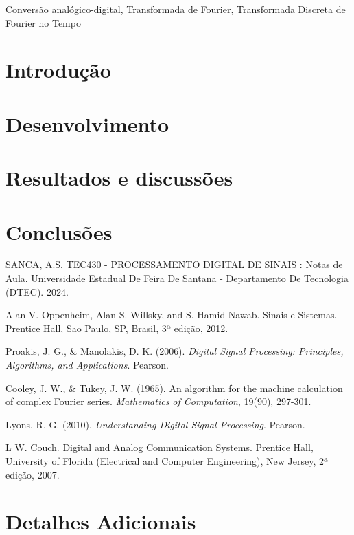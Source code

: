\documentclass[conference]{IEEEtran}
\begin{document}
\begin{IEEEkeywords}
Conversão analógico-digital, Transformada de Fourier, Transformada Discreta de Fourier no Tempo
\end{IEEEkeywords}

\section{Introdução}


\section{Desenvolvimento}


\section{Resultados e discussões}


\section{Conclusões}



\begin{thebibliography}{00}
 SANCA, A.S. TEC430 - PROCESSAMENTO DIGITAL DE SINAIS : Notas de Aula. Universidade Estadual De Feira De Santana - Departamento De Tecnologia (DTEC). 2024.

 Alan V. Oppenheim, Alan S. Willsky, and S. Hamid Nawab. Sinais e Sistemas. Prentice Hall, Sao Paulo, SP, Brasil, 3ª edição, 2012.

Proakis, J. G., \& Manolakis, D. K. (2006). \textit{Digital Signal Processing: Principles, Algorithms, and Applications}. Pearson.

Cooley, J. W., \& Tukey, J. W. (1965). An algorithm for the machine calculation of complex Fourier series. \textit{Mathematics of Computation}, 19(90), 297-301.

Lyons, R. G. (2010). \textit{Understanding Digital Signal Processing}. Pearson.

 L W. Couch. Digital and Analog Communication Systems. Prentice Hall, University of Florida (Electrical and Computer Engineering), New Jersey, 2ª edição, 2007.
\end{thebibliography}


\appendix
\section{Detalhes Adicionais}

\end{document}
